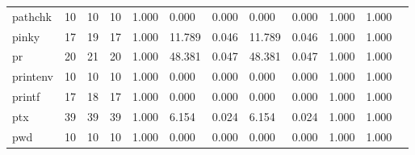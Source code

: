 \begin{longtable}{lp{1.00cm}p{1.00cm}p{1.00cm}p{1.00cm}p{1.00cm}p{1.00cm}p{1.00cm}p{1.00cm}p{1.00cm}p{1.00cm}p{1.00cm}}
pathchk   &                           10 &                 10 &                                10 &                                      1.000 &                                  0.000 &                                        0.000 &                             0.000 &                                   0.000 &                        1.000 &                                        1.000 \\
pinky     &                           17 &                 19 &                                17 &                                      1.000 &                                 11.789 &                                        0.046 &                            11.789 &                                   0.046 &                        1.000 &                                        1.000 \\
pr        &                           20 &                 21 &                                20 &                                      1.000 &                                 48.381 &                                        0.047 &                            48.381 &                                   0.047 &                        1.000 &                                        1.000 \\
printenv  &                           10 &                 10 &                                10 &                                      1.000 &                                  0.000 &                                        0.000 &                             0.000 &                                   0.000 &                        1.000 &                                        1.000 \\
printf    &                           17 &                 18 &                                17 &                                      1.000 &                                  0.000 &                                        0.000 &                             0.000 &                                   0.000 &                        1.000 &                                        1.000 \\
ptx       &                           39 &                 39 &                                39 &                                      1.000 &                                  6.154 &                                        0.024 &                             6.154 &                                   0.024 &                        1.000 &                                        1.000 \\
pwd       &                           10 &                 10 &                                10 &                                      1.000 &                                  0.000 &                                        0.000 &                             0.000 &                                   0.000 &                        1.000 &                                        1.000 \\

\end{longtable}
